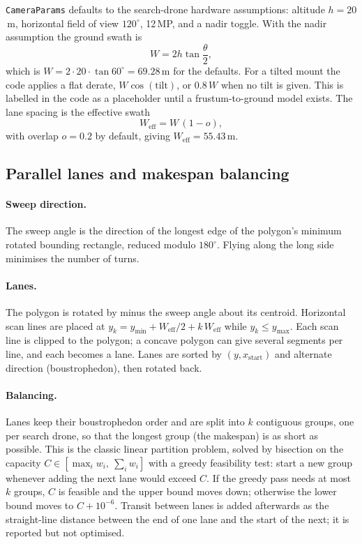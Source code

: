 \documentclass[11pt,a4paper]{article}
\newcommand{\code}[1]{\texttt{#1}}
\begin{document}
\code{CameraParams} defaults to the search-drone hardware assumptions: altitude $h=20$\,m, horizontal field
of view $120^\circ$, 12\,MP, and a nadir toggle. With the nadir assumption the ground swath is
\begin{equation}
W = 2h\tan\frac{\theta}{2},
\end{equation}
which is $W = 2\cdot20\cdot\tan60^\circ = 69.28$\,m for the defaults. For a tilted mount the code applies a
flat derate, $W\cos(\text{tilt})$, or $0.8\,W$ when no tilt is given. This is labelled in the code as a
placeholder until a frustum-to-ground model exists. The lane spacing is the effective swath
\begin{equation}
W_{\text{eff}} = W\,(1-o),
\end{equation}
with overlap $o=0.2$ by default, giving $W_{\text{eff}} = 55.43$\,m.

\subsection{Parallel lanes and makespan balancing}

\paragraph{Sweep direction.} The sweep angle is the direction of the longest edge of the polygon's minimum
rotated bounding rectangle, reduced modulo $180^\circ$. Flying along the long side minimises the number of
turns.

\paragraph{Lanes.} The polygon is rotated by minus the sweep angle about its centroid. Horizontal scan lines
are placed at $y_k = y_{\min} + W_{\text{eff}}/2 + k\,W_{\text{eff}}$ while $y_k\le y_{\max}$. Each scan line
is clipped to the polygon; a concave polygon can give several segments per line, and each becomes a lane.
Lanes are sorted by $(y, x_{\text{start}})$ and alternate direction (boustrophedon), then rotated back.

\paragraph{Balancing.} Lanes keep their boustrophedon order and are split into $k$ contiguous groups, one
per search drone, so that the longest group (the makespan) is as short as possible. This is the classic
linear partition problem, solved by bisection on the capacity $C\in[\max_i w_i,\ \sum_i w_i]$ with a greedy
feasibility test: start a new group whenever adding the next lane would exceed $C$. If the greedy pass needs
at most $k$ groups, $C$ is feasible and the upper bound moves down; otherwise the lower bound moves to
$C+10^{-6}$. Transit between lanes is added afterwards as the straight-line distance between the end of one
lane and the start of the next; it is reported but not optimised.
\end{document}
